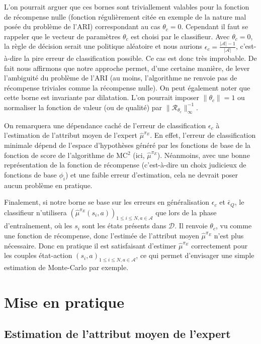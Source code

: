 \documentclass[english,utf8]{./hermes-journal}
\newcommand{\R}{\mathcal{R}}
\newcommand{\A}{\mathcal{A}}
\newcommand{\D}{\mathcal{D}}
\begin{document}
L'on pourrait arguer que ces bornes sont triviallement valables pour la fonction de récompense nulle (fonction régulièrement citée en exemple de la nature mal posée du problème de l'ARI) correspondant au cas $\theta_c=0$. Cependant il faut se rappeler que le vecteur de paramètres $\theta_c$ est choisi par le classifieur. Avec 
$\theta_c=0$, la règle de décision serait une politique aléatoire et nous aurions $\epsilon_c = \frac{|\A|-1}{|\A|}$, c'est-à-dire la pire erreur de classification possible. Ce cas est donc très improbable. De fait nous affirmons que notre approche permet, d'une certaine manière, de lever l'ambiguité du problème de l'ARI (au moins, l'algorithme ne renvoie pas de récompense triviales comme la récompense nulle).
%
On peut également noter que cette borne est invariante par dilatation. L'on pourrait imposer 
$\|\theta_c\|=1$ ou normaliser la fonction de valeur (ou de qualité) par 
$\|\R_{\theta_c}\|_\infty^{-1}$.

On remarquera une dépendance caché de l'erreur de classification  $\epsilon_c$ à l'estimation de l'attribut moyen de l'expert  $\hat{\mu}^{\pi_E}$. En effet, l'erreur de classification minimale dépend de l'espace d'hypothèses généré par les fonctions de base de la fonction de score de l'algorithme de MC$^2$ (ici, 
$\hat{\mu}^{\pi_E}$). Néanmoins, avec une bonne représentation de la fonction de récompense (c'est-à-dire un choix judicieux de fonctions de base $\phi_i$) et une faible erreur d'estimation, cela ne devrait poser aucun problème en pratique.

Finalement, si notre borne se base sur les erreurs en généralisation 
$\epsilon_c$ et $\bar{\epsilon}_Q$, le classifieur n'utilisera 
$(\hat{\mu}^{\pi_E}(s_i,a))_{1\leq i\leq N,a\in\A}$ que lors de la phase d'entraînement, où les $s_i$ sont les états présents dans $\D$. Il renvoie 
$\theta_c$, vu comme une fonction de récompense, donc l'estimée de l'attribut moyen $\hat{\mu}^{\pi_E}$ n'est plus nécessaire. Donc en pratique il est satisfaisant d'estimer 
$\hat{\mu}^{\pi_E}$ correctement pour les couples état-action $(s_i,a)_{1\leq i\leq
N,a\in\A}$, ce qui permet d'envisager une simple estimation de Monte-Carlo par exemple.

\section{Mise en pratique}
\label{sec:practicalApproach}

\subsection{Estimation de l'attribut moyen de l'expert}
\label{subsec:practicalApproach:muE}
\end{document}
